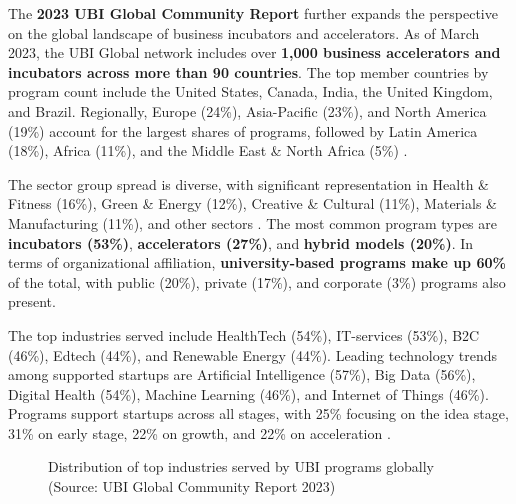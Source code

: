 \documentclass[../Main.tex]{subfiles}%
\begin{document}
	The \textbf{2023 UBI Global Community Report} further expands the perspective on the global landscape of business incubators and accelerators. As of March 2023, the UBI Global network includes over \textbf{1,000 business accelerators and incubators across more than 90 countries}. The top member countries by program count include the United States, Canada, India, the United Kingdom, and Brazil. Regionally, Europe (24\%), Asia-Pacific (23\%), and North America (19\%) account for the largest shares of programs, followed by Latin America (18\%), Africa (11\%), and the Middle East \& North Africa (5\%) \cite{Amin2024Incubators}.

	The sector group spread is diverse, with significant representation in Health \& Fitness (16\%), Green \& Energy (12\%), Creative \& Cultural (11\%), Materials \& Manufacturing (11\%), and other sectors \cite{Amin2024Incubators}. The most common program types are \textbf{incubators (53\%)}, \textbf{accelerators (27\%)}, and \textbf{hybrid models (20\%)}. In terms of organizational affiliation, \textbf{university-based programs make up 60\%} of the total, with public (20\%), private (17\%), and corporate (3\%) programs also present.

	The top industries served include HealthTech (54\%), IT-services (53\%), B2C (46\%), Edtech (44\%), and Renewable Energy (44\%). Leading technology trends among supported startups are Artificial Intelligence (57\%), Big Data (56\%), Digital Health (54\%), Machine Learning (46\%), and Internet of Things (46\%). Programs support startups across all stages, with 25\% focusing on the idea stage, 31\% on early stage, 22\% on growth, and 22\% on acceleration \cite{Amin2024Incubators}.

	\begin{figure}[h]
		\centering
		\caption{Distribution of top industries served by UBI programs globally (Source: UBI Global Community Report 2023)}
		\label{fig:top_industries}
	\end{figure}
\end{document}
